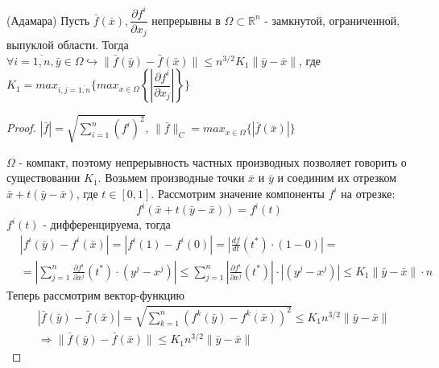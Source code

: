\begin{lemma} (Адамара)
	Пусть $\bar{f}(\bar{x}), \dfrac{\partial f^i}{\partial x_j}$ непрерывны в $\Omega \subset \mathbb{R}^n $ - замкнутой, ограниченной, выпуклой области. Тогда $\forall i = \overline{1,n}, \bar{y} \in \Omega \hookrightarrow \| \bar{f}(\bar{y}) - \bar{f}(\bar{x}) \| \le n^{3/2}K_1\|\overline{y} - \overline{x}\|$, где $K_1 = max_{i,j=\overline{1,n}}\{max_{x\in\Omega}\left\{\left|\dfrac{\partial f^i}{\partial x_j}\right|\right\} \}$
\end{lemma}

\begin{proof}
	
	$|\bar{f}| = \sqrt{\sum\limits_{i=1}^n (f^i)^2}$, $\|\bar{f}\|_C = max_{x\in\Omega}\{|\bar{f}(\bar{x})|\}$
	
	$\Omega$ - компакт, поэтому непрерывность частных производных позволяет говорить о существовании $K_1$. Возьмем производные точки $\bar{x}$ и $\bar{y}$ и соединим их отрезком $\bar{x} + t(\bar{y} - \bar{x})$, где $t\in[0, 1]$. Рассмотрим значение компоненты $f^i$ на отрезке:
	\[
		f^i(\bar{x} + t(\bar{y} - \bar{x})) = f^i(t)
	\]
	$f^i(t)$ - дифференцируема, тогда
	\begin{align*}
		&|f^i(\bar{y}) - f^i(\bar{x})| = |f^i(1) - f^i(0)| = \left| \frac{df}{dt}(t^*)\cdot(1-0)\right| = \\
		&= \left|\sum\limits_{j=1}^n\frac{\partial f^i}{\partial x^j}(t^*)\cdot(y^j - x^j)\right| \le \sum\limits_{j=1}^n\left|\frac{\partial f^i}{\partial x^j}(t^*)\right|\cdot\left|(y^j - x^j)\right| \le K_1\|\bar{y}-\bar{x}\|\cdot n
	\end{align*}
	Теперь рассмотрим вектор-функцию
	\begin{align*}
		&|\bar{f}(\bar{y}) - \bar{f}(\bar{x})| = \sqrt{\sum\limits_{k=1}^n (f^k(\bar{y}) - f^k(\bar{x}))^2} \le K_1n^{3/2}\|\bar{y}-\bar{x}\| \\
		&\Rightarrow \|\bar{f}(\bar{y}) - \bar{f}(\bar{x})\| \le K_1n^{3/2}\|\bar{y}-\bar{x}\|
	\end{align*}
\end{proof}

